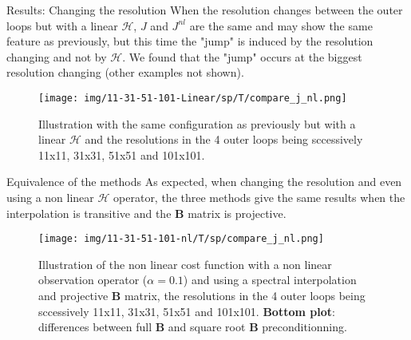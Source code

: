 \documentclass[8pt]{beamer}
\begin{document}
\begin{frame}{Results: Changing the resolution}
When the resolution changes between the outer loops but with a linear $\mathcal{H}$, $J$ and $J^{nl}$ are the same and may show the same feature as previously, but this time the "jump" is induced by the resolution changing and not by $\mathcal{H}$. We found that the "jump" occurs at the biggest resolution changing (other examples not shown).
\vspace{-0.2cm}
\begin{center}
\begin{figure}
  \begin{minipage}[c]{0.67\textwidth}
    \texttt{[image: img/11-31-51-101-Linear/sp/T/compare\_j\_nl.png]}
  \end{minipage}\hfill
  \begin{minipage}[c]{0.23\textwidth}
    \caption{Illustration with the same configuration as previously but with a linear $\mathcal{H}$ and the resolutions in the 4 outer loops being sccessively 11x11, 31x31, 51x51 and 101x101.}
  \end{minipage}
\end{figure}
\end{center}
\end{frame}

\begin{frame}{Equivalence of the methods}
As expected, when changing the resolution and even using a non linear $\mathcal{H}$ operator, the three methods give the same results when the interpolation is transitive and the $\mathbf{B}$ matrix is projective.
\vspace{-0.2cm}
\begin{center}
\begin{figure}
  \begin{minipage}[c]{0.67\textwidth}
    \texttt{[image: img/11-31-51-101-nl/T/sp/compare\_j\_nl.png]}
  \end{minipage}\hfill
  \begin{minipage}[c]{0.23\textwidth}
    \caption{Illustration of the non linear cost function with a non linear observation operator ($\alpha=0.1$) and using a spectral interpolation and projective $\mathbf{B}$ matrix, the resolutions in the 4 outer loops being sccessively 11x11, 31x31, 51x51 and 101x101. \textbf{Bottom plot}: differences between full $\mathbf{B}$ and square root $\mathbf{B}$ preconditionning.}
    \label{fig:jnlsp}
  \end{minipage}
\end{figure}
\end{center}
\end{frame}
\end{document}
